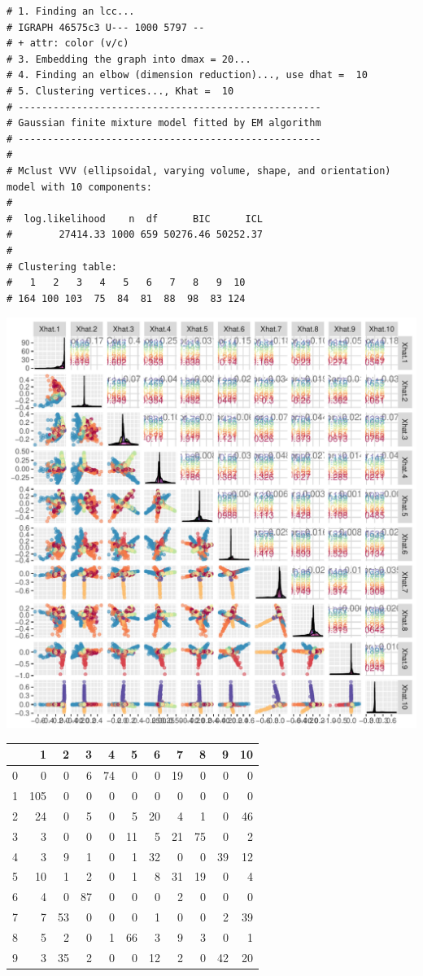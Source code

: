 \documentclass[]{article}
\begin{document}
\begin{verbatim}
# 1. Finding an lcc...
# IGRAPH 46575c3 U--- 1000 5797 -- 
# + attr: color (v/c)
# 3. Embedding the graph into dmax = 20...
# 4. Finding an elbow (dimension reduction)..., use dhat =  10 
# 5. Clustering vertices..., Khat =  10 
# ----------------------------------------------------
# Gaussian finite mixture model fitted by EM algorithm 
# ----------------------------------------------------
# 
# Mclust VVV (ellipsoidal, varying volume, shape, and orientation) model with 10 components:
# 
#  log.likelihood    n  df      BIC      ICL
#        27414.33 1000 659 50276.46 50252.37
# 
# Clustering table:
#   1   2   3   4   5   6   7   8   9  10 
# 164 100 103  75  84  81  88  98  83 124
\end{verbatim}

\includegraphics{gmmase_files/figure-latex/knnplot-3.pdf}

\begin{longtable}[]{@{}lrrrrrrrrrr@{}}
\toprule
& 1 & 2 & 3 & 4 & 5 & 6 & 7 & 8 & 9 & 10\tabularnewline
\midrule
\endhead
0 & 0 & 0 & 6 & 74 & 0 & 0 & 19 & 0 & 0 & 0\tabularnewline
1 & 105 & 0 & 0 & 0 & 0 & 0 & 0 & 0 & 0 & 0\tabularnewline
2 & 24 & 0 & 5 & 0 & 5 & 20 & 4 & 1 & 0 & 46\tabularnewline
3 & 3 & 0 & 0 & 0 & 11 & 5 & 21 & 75 & 0 & 2\tabularnewline
4 & 3 & 9 & 1 & 0 & 1 & 32 & 0 & 0 & 39 & 12\tabularnewline
5 & 10 & 1 & 2 & 0 & 1 & 8 & 31 & 19 & 0 & 4\tabularnewline
6 & 4 & 0 & 87 & 0 & 0 & 0 & 2 & 0 & 0 & 0\tabularnewline
7 & 7 & 53 & 0 & 0 & 0 & 1 & 0 & 0 & 2 & 39\tabularnewline
8 & 5 & 2 & 0 & 1 & 66 & 3 & 9 & 3 & 0 & 1\tabularnewline
9 & 3 & 35 & 2 & 0 & 0 & 12 & 2 & 0 & 42 & 20\tabularnewline
\bottomrule
\end{longtable}
\end{document}
